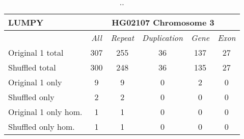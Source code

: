 \begin{table}[htb]
\caption{ .. }
\begin{center}
\begin{tabular}{|l|c||c|c|c|c|}
\hline
{\bf LUMPY} & \multicolumn{5}{|c|}{\bf HG02107 Chromosome 3} \\
\hline
\cline{2-6}
{\bf} & {\it All} & {\it Repeat} & {\it Duplication} & {\it Gene} & {\it Exon} \\
\hline
Original 1 total & 307 & 255 & 36 & 137 & 27 \\
\hline
Shuffled total & 300 & 248 & 36 & 135 & 27 \\
\hline
Original 1 only & 9 & 9 & 0 & 2 & 0\\ 
\hline
Shuffled only & 2 & 2 & 0 & 0 & 0 \\
\hline
Original 1 only hom. & 1 & 1 & 0 & 0 & 0\\ 
\hline
Shuffled only hom. & 1 & 1 & 0 & 0 & 0\\  
\hline
\end{tabular}
\end{center}
\label{tab:orig-vs-shuf-lumpy}
\end{table}

